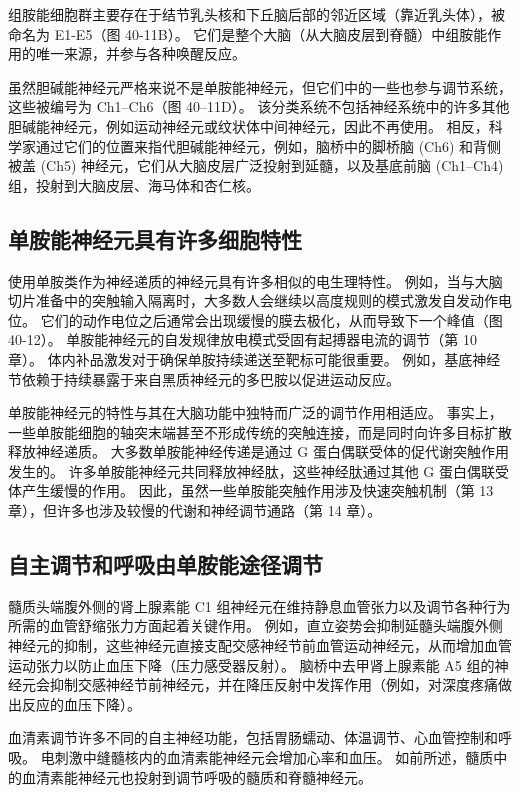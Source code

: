组胺能细胞群主要存在于结节乳头核和下丘脑后部的邻近区域（靠近乳头体），被命名为 E1-E5（图 40-11B）。 它们是整个大脑（从大脑皮层到脊髓）中组胺能作用的唯一来源，并参与各种唤醒反应。

虽然胆碱能神经元严格来说不是单胺能神经元，但它们中的一些也参与调节系统，这些被编号为 Ch1–Ch6（图 40–11D）。 该分类系统不包括神经系统中的许多其他胆碱能神经元，例如运动神经元或纹状体中间神经元，因此不再使用。 相反，科学家通过它们的位置来指代胆碱能神经元，例如，脑桥中的脚桥脑 (Ch6) 和背侧被盖 (Ch5) 神经元，它们从大脑皮层广泛投射到延髓，以及基底前脑 (Ch1–Ch4) 组，投射到大脑皮层、海马体和杏仁核。

\subsection{单胺能神经元具有许多细胞特性}
使用单胺类作为神经递质的神经元具有许多相似的电生理特性。 例如，当与大脑切片准备中的突触输入隔离时，大多数人会继续以高度规则的模式激发自发动作电位。 它们的动作电位之后通常会出现缓慢的膜去极化，从而导致下一个峰值（图 40-12）。 单胺能神经元的自发规律放电模式受固有起搏器电流的调节（第 10 章）。 体内补品激发对于确保单胺持续递送至靶标可能很重要。 例如，基底神经节依赖于持续暴露于来自黑质神经元的多巴胺以促进运动反应。

单胺能神经元的特性与其在大脑功能中独特而广泛的调节作用相适应。 事实上，一些单胺能细胞的轴突末端甚至不形成传统的突触连接，而是同时向许多目标扩散释放神经递质。 大多数单胺能神经传递是通过 G 蛋白偶联受体的促代谢突触作用发生的。 许多单胺能神经元共同释放神经肽，这些神经肽通过其他 G 蛋白偶联受体产生缓慢的作用。 因此，虽然一些单胺能突触作用涉及快速突触机制（第 13 章），但许多也涉及较慢的代谢和神经调节通路（第 14 章）。

\subsection{自主调节和呼吸由单胺能途径调节}
髓质头端腹外侧的肾上腺素能 C1 组神经元在维持静息血管张力以及调节各种行为所需的血管舒缩张力方面起着关键作用。 例如，直立姿势会抑制延髓头端腹外侧神经元的抑制，这些神经元直接支配交感神经节前血管运动神经元，从而增加血管运动张力以防止血压下降（压力感受器反射）。 脑桥中去甲肾上腺素能 A5 组的神经元会抑制交感神经节前神经元，并在降压反射中发挥作用（例如，对深度疼痛做出反应的血压下降）。

血清素调节许多不同的自主神经功能，包括胃肠蠕动、体温调节、心血管控制和呼吸。 电刺激中缝髓核内的血清素能神经元会增加心率和血压。 如前所述，髓质中的血清素能神经元也投射到调节呼吸的髓质和脊髓神经元。

